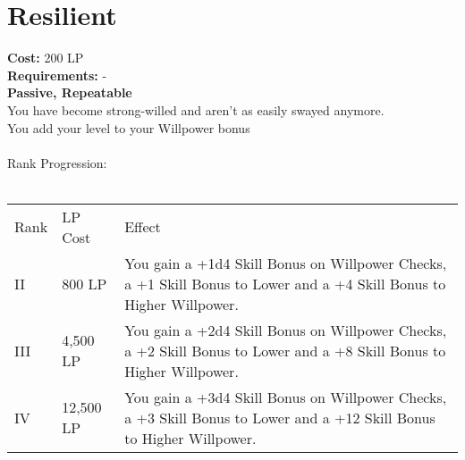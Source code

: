 \section{Resilient}\label{perk:resilient}
\textbf{Cost:} 200 LP\\
\textbf{Requirements:} -\\
\textbf{Passive, Repeatable}\\
You have become strong-willed and aren't as easily swayed anymore.\\
You add your level to your Willpower bonus\\
\\
Rank Progression:\\
\\
\begin{longtable}{l | l | p{9cm}}
	Rank & LP Cost & Effect\\
	II & 800 LP & You gain a +1d4 Skill Bonus on Willpower Checks, a +1 Skill Bonus to Lower and a +4 Skill Bonus to Higher Willpower.\\
	III & 4,500 LP & You gain a +2d4 Skill Bonus on Willpower Checks, a +2 Skill Bonus to Lower and a +8 Skill Bonus to Higher Willpower.\\
	IV & 12,500 LP & You gain a +3d4 Skill Bonus on Willpower Checks, a +3 Skill Bonus to Lower and a +12 Skill Bonus to Higher Willpower.\\
\end{longtable}
